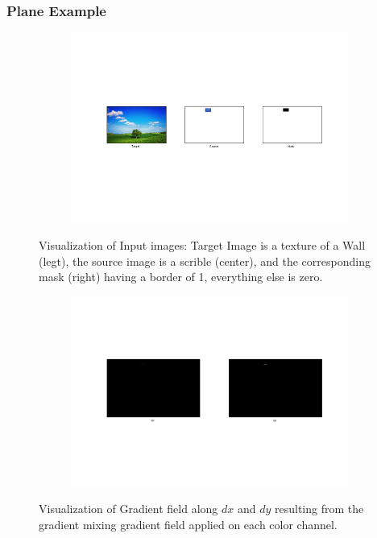 \documentclass{paper}
\begin{document}
\subsubsection{Plane Example}
\begin{figure}[H]
    \centering
    \begin{subfigure}{1.0\textwidth}
        \includegraphics[width=\textwidth]{../../outputs/p4/seamless_cloning/plane/input}
    \end{subfigure}
    \caption{Visualization of Input images: Target Image is a texture of a Wall (legt), the source image is a scrible (center), and the corresponding mask (right) having a border of 1, everything else is zero.}
    \label{fig:gradient_mixing_input}       
\end{figure}


\begin{figure}[H]
    \centering
    \begin{subfigure}{1.0\textwidth}
        \includegraphics[width=\textwidth]{../../outputs/p4/seamless_cloning/plane/gradients}
    \end{subfigure}
    \caption{Visualization of Gradient field along $dx$ and $dy$ resulting from the gradient mixing gradient field applied on each color channel.}
    \label{fig:gradient_mixing_gradients}       
\end{figure}
\end{document}
